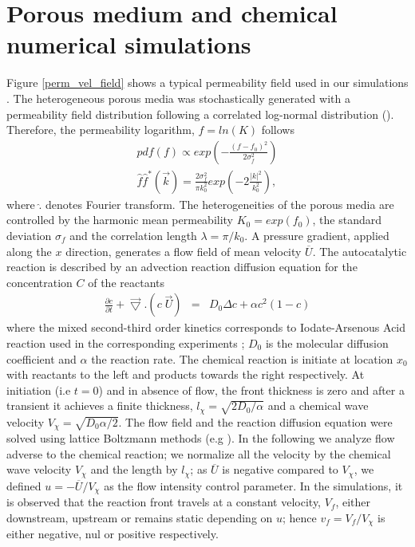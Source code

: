 \documentclass[doublecol]{epl2}
\begin{document}
\section{Porous medium and chemical numerical simulations}
Figure \ref{perm_vel_field} shows a typical permeability field used in our simulations \cite{talon03}.
 The heterogeneous porous media was stochastically generated with a permeability field distribution following a correlated log-normal distribution (\cite{gelhar83}). Therefore, the permeability logarithm, $f=ln(K)$ follows
\begin{eqnarray}
pdf(f)\propto exp(-\frac{(f-f_0)^2}{2\sigma_f^2}) \\
\hat f \hat f^*(\vec k) = \frac{2 \sigma_f^2}{\pi k_0^2}  exp(-2 \frac{|k|^2}{k^2_0}),
\end{eqnarray}
where $\hat .$ denotes Fourier transform.
The heterogeneities of the porous media are controlled by the harmonic mean permeability $K_0 = exp(f_0)$, the standard deviation $\sigma_f$ and the correlation length  $\lambda = \pi / k_0$.
 A pressure gradient, applied along the $x$ direction, generates a flow field of mean velocity $\overline{U}$.
The autocatalytic reaction is described by an advection reaction diffusion equation for the concentration $C$ of the reactants
\begin{eqnarray}
  \frac{\partial c}{\partial t} + \vec{\bigtriangledown}.(c \; \vec{U}) & = & D_0 \Delta c + \alpha c^2(1 - c)
\label{pt_trans}
\end{eqnarray}
where the mixed second-third order kinetics corresponds to Iodate-Arsenous Acid reaction used in the corresponding experiments \cite{scott94,leconte03,atis12b}; $D_0$ is the molecular diffusion coefficient and $\alpha$ the reaction rate.  The chemical reaction is initiate at
location $x_0$ with reactants to the left and products towards the right respectively. At initiation (i.e $t = 0$)  and in absence of flow, the front thickness is zero and after a transient it achieves a
finite thickness, $l_\chi=\sqrt{2 D_0 / \alpha}$ and a chemical wave velocity $V_\chi = \sqrt{D_0 \alpha /2}$. 
The flow field and the reaction diffusion equation were solved using lattice Boltzmann methods (e.g \cite{talon03,talon04b,jarrige10a}). 
In the following we analyze flow adverse to the chemical reaction; we normalize all the velocity by the chemical wave velocity $V_{\chi}$ and the length by $l_{\chi}$; as $\overline{U}$ is negative compared to $V_{\chi}$, we defined $u=-\overline{U}/V_{\chi}$ as the flow intensity control parameter.
In the simulations, it is observed that the reaction front travels at a constant velocity, $V_f$, either downstream, upstream or remains static depending on $u$; hence $v_f=V_f/V_{\chi}$ is either negative, nul or positive respectively.
\end{document}
